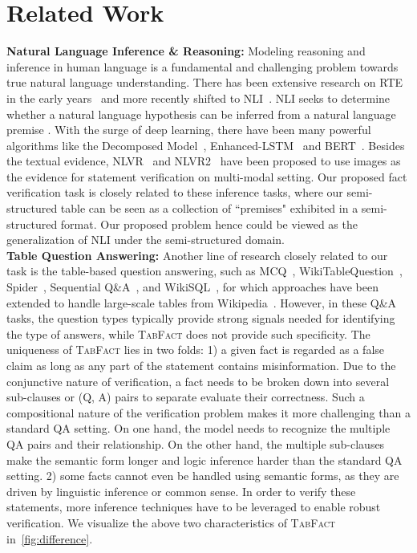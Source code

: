 \documentclass{article} \usepackage{iclr2020_conference,times}
\begin{document}
\section{Related Work}
\noindent \textbf{Natural Language Inference \& Reasoning:}
Modeling reasoning and inference in human language is a fundamental and challenging problem towards true natural language understanding. There has been extensive research on RTE in the early years~\citep{dagan2005pascal} and more recently shifted to NLI~\citep{bowman2015large,williams2017broad}. NLI seeks to determine whether a natural language hypothesis  can be inferred from a natural language premise . With the surge of deep learning, there have been many powerful algorithms like the Decomposed Model~\citep{parikh2016decomposable}, Enhanced-LSTM~\citep{chen2017enhanced} and BERT~\citep{devlin2018bert}. Besides the textual evidence, NLVR~\citep{suhr2017corpus} and NLVR2~\citep{suhr2019corpus} have been proposed to use images as the evidence for statement verification on multi-modal setting. Our proposed fact verification task is closely related to these inference tasks, where our semi-structured table can be seen as a collection of ``premises" exhibited in a semi-structured format. Our proposed problem hence could be viewed as the generalization of NLI under the semi-structured domain.\vspace{3px}\\
\noindent \textbf{Table Question Answering:}
Another line of research closely related to our task is the table-based question answering, such as MCQ~\citep{jauhar2016tables}, WikiTableQuestion~\citep{pasupat2015compositional}, Spider~\citep{yu2018spider}, Sequential Q\&A~\citep{iyyer2017search}, and WikiSQL~\citep{zhong2017seq2sql}, for which approaches have been extended to handle large-scale tables from Wikipedia~\citep{bhagavatula2013methods}. However, in these Q\&A tasks, the question types typically provide strong signals needed for identifying the type of answers, while \textsc{TabFact} does not provide such specificity. The uniqueness of \textsc{TabFact} lies in two folds: 1) a given fact is regarded as a false claim as long as any part of the statement contains misinformation. Due to the conjunctive nature of verification, a fact needs to be broken down into several sub-clauses or (Q, A) pairs to separate evaluate their correctness. Such a compositional nature of the verification problem makes it more challenging than a standard QA setting. On one hand, the model needs to recognize the multiple QA pairs and their relationship. On the other hand, the multiple sub-clauses make the semantic form longer and logic inference harder than the standard QA setting. 2) some facts cannot even be handled using semantic forms, as they are driven by linguistic inference or common sense. In order to verify these statements, more inference techniques have to be leveraged to enable robust verification. We visualize the above two characteristics of \textsc{TabFact} in~\autoref{fig:difference}.
\end{document}
